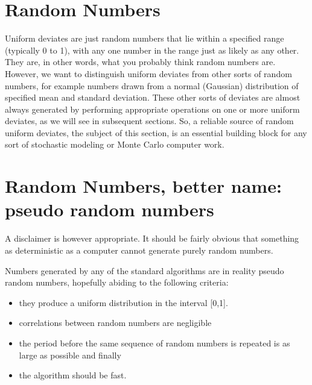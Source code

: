 \documentclass[letterpaper,10pt,english]{sphinxmanual}
\begin{document}
\section{Random Numbers}
\label{\detokenize{chapter3:random-numbers}}
Uniform deviates are just random numbers that lie within a specified range
(typically 0 to 1), with any one number in the range just as likely as any other. They
are, in other words, what you probably think random numbers are. However,
we want to distinguish uniform deviates from other sorts of random numbers, for
example numbers drawn from a normal (Gaussian) distribution of specified mean
and standard deviation. These other sorts of deviates are almost always generated by
performing appropriate operations on one or more uniform deviates, as we will see
in subsequent sections. So, a reliable source of random uniform deviates, the subject
of this section, is an essential building block for any sort of stochastic modeling
or Monte Carlo computer work.


\section{Random Numbers, better name: pseudo random numbers}
\label{\detokenize{chapter3:random-numbers-better-name-pseudo-random-numbers}}
A disclaimer is however appropriate. It should be fairly obvious that
something as deterministic as a computer cannot generate purely random numbers.

Numbers generated by any of the standard algorithms are in reality pseudo random
numbers, hopefully abiding to the following criteria:
\begin{itemize}
\item {} 
they produce a uniform distribution in the interval {[}0,1{]}.

\item {} 
correlations between random numbers are negligible

\item {} 
the period before the same sequence of random numbers is repeated   is as large as possible and finally

\item {} 
the algorithm should be fast.

\end{itemize}
\end{document}

